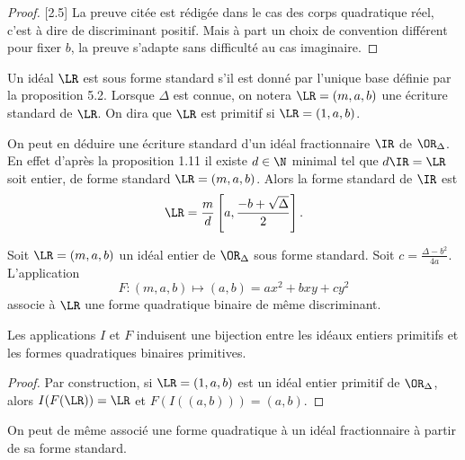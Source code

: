 \begin{proof}\cite{Buchmann95}[2.5]
	La preuve citée est rédigée dans le cas des corps quadratique réel, c'est à dire de discriminant positif. Mais à part un choix de convention différent pour fixer $b$, la preuve s'adapte sans difficulté au cas imaginaire.
\end{proof}

\begin{Def}
	Un idéal $\LR$ est sous forme standard s'il est donné par l'unique base définie par la proposition 5.2. Lorsque $\Delta$ est connue, on notera $\LR = (m,a,b)$ une écriture standard de $\LR$. On dira que $\LR$ est primitif si $\LR = (1,a,b)$.
	
\end{Def}

\begin{Rem}
	On peut en déduire une écriture standard d'un idéal fractionnaire $\IR$ de $\OR_{\Delta}$. En effet d'après la proposition 1.11 il existe $d\in\N$ minimal tel que $d\IR = \LR$ soit entier, de forme standard $\LR = (m,a,b)$. Alors la forme standard de $\IR$ est
	\begin{equation*}
		\LR = \frac{m}{d}\left[ a , \frac{-b + \sqrt{\Delta}}{2}\right].
	\end{equation*}
\end{Rem}


\begin{Coro}
	Soit $\LR = (m,a,b)$ un idéal entier de $\OR_{\Delta}$ sous forme standard. Soit $c = \frac{\Delta - b^2}{4a}$. L'application
	\begin{equation*}
		F : (m,a,b)\mapsto (a,b) = ax^2 + bxy + cy^2
	\end{equation*}
	associe à $\LR$ une forme quadratique binaire de même discriminant. 
	
\end{Coro}

\begin{Prop}
	Les applications $I$ et $F$ induisent une bijection entre les idéaux entiers primitifs et les formes quadratiques binaires primitives.
\end{Prop}

\begin{proof}
	Par construction, si $\LR = (1,a,b)$ est un idéal entier primitif de $\OR_{\Delta}$, alors $I(F(\LR)) = \LR$ et $F(I((a,b))) = (a,b)$.
\end{proof}

\begin{Rem}
	On peut de même associé une forme quadratique à un idéal fractionnaire à partir de sa forme standard. 
\end{Rem}

